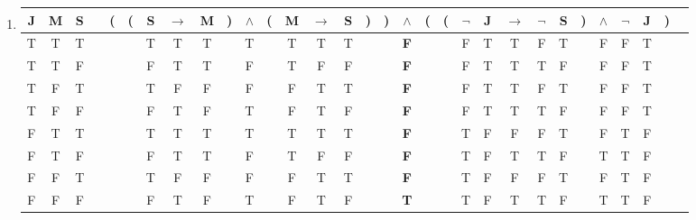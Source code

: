 \begin{enumerate}
	\item
	      \begin{tabular}{@{ }c@{ }@{ }c@{ }@{ }c | c@{ }@{}c@{}@{}c@{}@{ }c@{ }@{ }c@{ }@{ }c@{ }@{}c@{}@{ }c@{ }@{}c@{}@{ }c@{ }@{ }c@{ }@{ }c@{ }@{}c@{}@{}c@{}@{ }c@{ }@{}c@{}@{}c@{}@{ }c@{ }@{ }c@{ }@{ }c@{ }@{ }c@{ }@{ }c@{ }@{}c@{}@{ }c@{ }@{ }c@{ }@{ }c@{ }@{}c@{}@{ }c}
		      J & M & S &  & ( & ( & S & $\rightarrow$ & M & ) & $\land$ & ( & M & $\rightarrow$ & S & ) & ) & $\land$    & ( & ( & $\lnot$ & J & $\rightarrow$ & $\lnot$ & S & ) & $\land$ & $\lnot$ & J & ) & \\
		      \hline
		      T & T & T &  &   &   & T & T             & T &   & T       &   & T & T             & T &   &   & \textbf{F} &   &   & F       & T & T             & F       & T &   & F       & F       & T &   & \\
		      T & T & F &  &   &   & F & T             & T &   & F       &   & T & F             & F &   &   & \textbf{F} &   &   & F       & T & T             & T       & F &   & F       & F       & T &   & \\
		      T & F & T &  &   &   & T & F             & F &   & F       &   & F & T             & T &   &   & \textbf{F} &   &   & F       & T & T             & F       & T &   & F       & F       & T &   & \\
		      T & F & F &  &   &   & F & T             & F &   & T       &   & F & T             & F &   &   & \textbf{F} &   &   & F       & T & T             & T       & F &   & F       & F       & T &   & \\
		      F & T & T &  &   &   & T & T             & T &   & T       &   & T & T             & T &   &   & \textbf{F} &   &   & T       & F & F             & F       & T &   & F       & T       & F &   & \\
		      F & T & F &  &   &   & F & T             & T &   & F       &   & T & F             & F &   &   & \textbf{F} &   &   & T       & F & T             & T       & F &   & T       & T       & F &   & \\
		      F & F & T &  &   &   & T & F             & F &   & F       &   & F & T             & T &   &   & \textbf{F} &   &   & T       & F & F             & F       & T &   & F       & T       & F &   & \\
		      F & F & F &  &   &   & F & T             & F &   & T       &   & F & T             & F &   &   & \textbf{T} &   &   & T       & F & T             & T       & F &   & T       & T       & F &   & \\
	      \end{tabular}


\end{enumerate}
